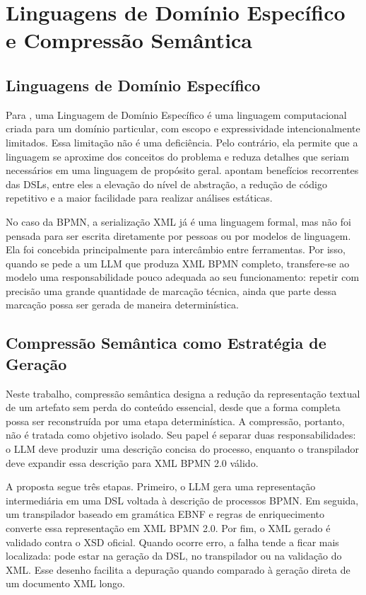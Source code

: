 \section{Linguagens de Domínio Específico e Compressão Semântica}
\label{sec:dsl-compressao}

\subsection{Linguagens de Domínio Específico}
\label{subsec:dsl}

Para , uma Linguagem de Domínio Específico é uma linguagem computacional criada para um domínio particular, com escopo e expressividade intencionalmente limitados. Essa limitação não é uma deficiência. Pelo contrário, ela permite que a linguagem se aproxime dos conceitos do problema e reduza detalhes que seriam necessários em uma linguagem de propósito geral.  apontam benefícios recorrentes das DSLs, entre eles a elevação do nível de abstração, a redução de código repetitivo e a maior facilidade para realizar análises estáticas.

No caso da BPMN, a serialização XML já é uma linguagem formal, mas não foi pensada para ser escrita diretamente por pessoas ou por modelos de linguagem. Ela foi concebida principalmente para intercâmbio entre ferramentas. Por isso, quando se pede a um LLM que produza XML BPMN completo, transfere-se ao modelo uma responsabilidade pouco adequada ao seu funcionamento: repetir com precisão uma grande quantidade de marcação técnica, ainda que parte dessa marcação possa ser gerada de maneira determinística.

\subsection{Compressão Semântica como Estratégia de Geração}
\label{subsec:compressao-semantica}

Neste trabalho, compressão semântica designa a redução da representação textual de um artefato sem perda do conteúdo essencial, desde que a forma completa possa ser reconstruída por uma etapa determinística. A compressão, portanto, não é tratada como objetivo isolado. Seu papel é separar duas responsabilidades: o LLM deve produzir uma descrição concisa do processo, enquanto o transpilador deve expandir essa descrição para XML BPMN 2.0 válido.

A proposta segue três etapas. Primeiro, o LLM gera uma representação intermediária em uma DSL voltada à descrição de processos BPMN. Em seguida, um transpilador baseado em gramática EBNF e regras de enriquecimento converte essa representação em XML BPMN 2.0. Por fim, o XML gerado é validado contra o XSD oficial. Quando ocorre erro, a falha tende a ficar mais localizada: pode estar na geração da DSL, no transpilador ou na validação do XML. Esse desenho facilita a depuração quando comparado à geração direta de um documento XML longo.

